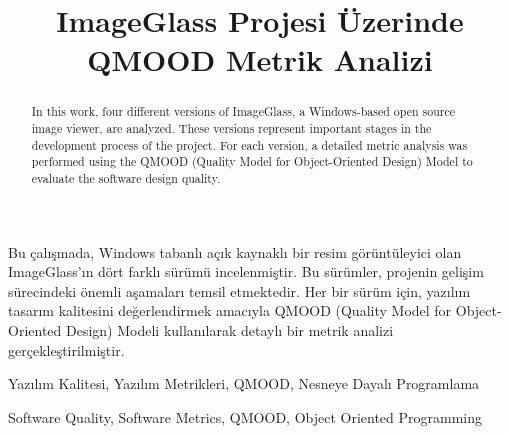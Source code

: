\documentclass[conference]{IEEEtran}
\begin{document}

%
\title{ImageGlass Projesi Üzerinde QMOOD Metrik Analizi}
\author{
		
}

\maketitle

\begin{ozet}
Bu çalışmada, Windows tabanlı açık kaynaklı bir resim görüntüleyici olan ImageGlass'ın dört farklı sürümü incelenmiştir. Bu sürümler, projenin gelişim sürecindeki önemli aşamaları temsil etmektedir. Her bir sürüm için, yazılım tasarım kalitesini değerlendirmek amacıyla QMOOD (Quality Model for Object-Oriented Design) Modeli kullanılarak detaylı bir metrik analizi gerçekleştirilmiştir.
\end{ozet}
\begin{IEEEanahtar}
Yazılım Kalitesi, Yazılım Metrikleri, QMOOD, Nesneye Dayalı
Programlama
\end{IEEEanahtar}

\begin{abstract}
In this work, four different versions of ImageGlass, a Windows-based open source image viewer, are analyzed. These versions represent important stages in the development process of the project. For each version, a detailed metric analysis was performed using the QMOOD (Quality Model for Object-Oriented Design) Model to evaluate the software design quality.  
\end{abstract}
\begin{IEEEkeywords}
Software Quality, Software Metrics, QMOOD, Object Oriented Programming
\end{IEEEkeywords}
\end{document}

